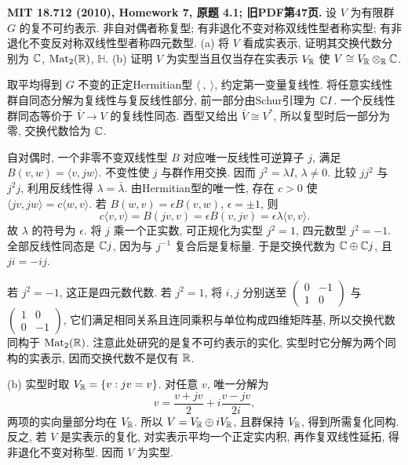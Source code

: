 \begin{exercise}\label{hw:4.1}
\textbf{MIT 18.712 (2010), Homework 7, 原题 4.1; 旧PDF第47页.}
设 $V$ 为有限群 $G$ 的复不可约表示. 非自对偶者称复型; 有非退化不变对称双线性型者称实型; 有非退化不变反对称双线性型者称四元数型.
(a) 将 $V$ 看成实表示, 证明其交换代数分别为 $\mathbb C$, $\operatorname{Mat}_2(\mathbb R)$, $\mathbb H$.
(b) 证明 $V$ 为实型当且仅当存在实表示 $V_\mathbb R$ 使 $V\cong V_\mathbb R\otimes_\mathbb R\mathbb C$.
\end{exercise}
\begin{solution}
取平均得到 $G$ 不变的正定Hermitian型 $\langle\ ,\ \rangle$, 约定第一变量复线性. 将任意实线性群自同态分解为复线性与复反线性部分, 前一部分由Schur引理为 $\mathbb C I$. 一个反线性群同态等价于 $\bar V\to V$ 的复线性同态. 酉型又给出 $\bar V\cong V^*$, 所以复型时后一部分为零, 交换代数恰为 $\mathbb C$.

自对偶时, 一个非零不变双线性型 $B$ 对应唯一反线性可逆算子 $j$, 满足 $B(v,w)=\langle v,jw\rangle$. 不变性使 $j$ 与群作用交换. 因而 $j^2=\lambda I$, $\lambda\ne0$. 比较 $j j^2$ 与 $j^2j$, 利用反线性得 $\lambda=\bar\lambda$. 由Hermitian型的唯一性, 存在 $c>0$ 使 $\langle jv,jw\rangle=c\langle w,v\rangle$. 若 $B(w,v)=\epsilon B(v,w)$, $\epsilon=\pm1$, 则
\[
 c\langle v,v\rangle=B(jv,v)
 =\epsilon B(v,jv)=\epsilon\lambda\langle v,v\rangle.
\]
故 $\lambda$ 的符号为 $\epsilon$. 将 $j$ 乘一个正实数, 可正规化为实型 $j^2=1$, 四元数型 $j^2=-1$. 全部反线性同态是 $\mathbb C j$, 因为与 $j^{-1}$ 复合后是复标量. 于是交换代数为 $\mathbb C\oplus\mathbb C j$, 且 $ji=-ij$.

若 $j^2=-1$, 这正是四元数代数. 若 $j^2=1$, 将 $i,j$ 分别送至 $\begin{pmatrix}0&-1\\1&0\end{pmatrix}$ 与 $\begin{pmatrix}1&0\\0&-1\end{pmatrix}$, 它们满足相同关系且连同乘积与单位构成四维矩阵基, 所以交换代数同构于 $\operatorname{Mat}_2(\mathbb R)$. 注意此处研究的是复不可约表示的实化, 实型时它分解为两个同构的实表示, 因而交换代数不是仅有 $\mathbb R$.

(b) 实型时取 $V_\mathbb R=\{v:jv=v\}$. 对任意 $v$, 唯一分解为
\[
 v=\frac{v+jv}{2}+i\frac{v-jv}{2i},
\]
两项的实向量部分均在 $V_\mathbb R$. 所以 $V=V_\mathbb R\oplus iV_\mathbb R$, 且群保持 $V_\mathbb R$, 得到所需复化同构. 反之, 若 $V$ 是实表示的复化, 对实表示平均一个正定实内积, 再作复双线性延拓, 得非退化不变对称型. 因而 $V$ 为实型.
\end{solution}

